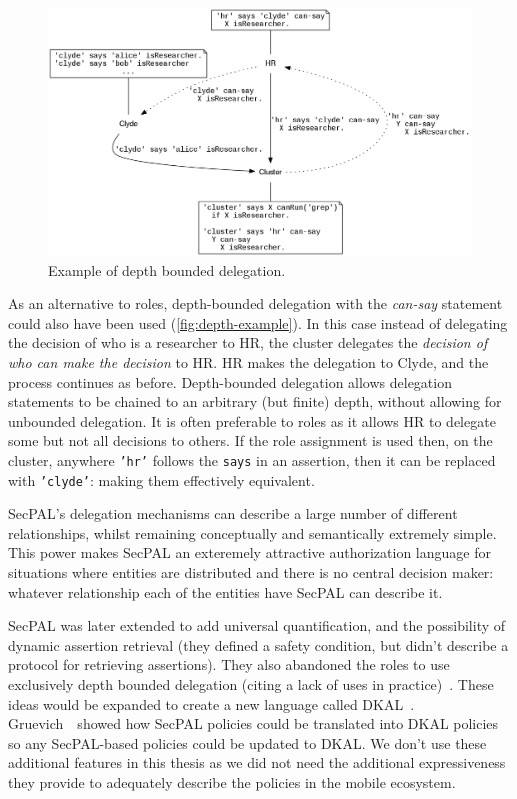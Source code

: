 \documentclass[thesis.tex]{subfiles}
\begin{document}
\begin{figure}
  \centering
  \includegraphics[width=\textwidth]{figures/secpal-example-delegation2.png}
  \caption{Example of depth bounded delegation.}
  \label{fig:depth-example}
\end{figure}

As an alternative to roles, depth-bounded delegation with the
\emph{can-say} statement could also have been used
(\autoref{fig:depth-example}).  In this case instead of delegating the
decision of who is a researcher to HR, the cluster delegates the
\emph{decision of who can make the decision} to HR.  HR makes the
delegation to Clyde, and the process continues as before.
Depth-bounded delegation allows delegation statements to be chained to
an arbitrary (but finite) depth, without allowing for unbounded
delegation.  It is often preferable to roles as it allows HR to
delegate some but not all decisions to others.  If the role assignment
is used then, on the cluster, anywhere \texttt{'hr'} follows the
\texttt{says} in an assertion, then it can be replaced with
\texttt{'clyde'}: making them effectively equivalent.

SecPAL's delegation mechanisms can describe a large number of
different relationships, whilst remaining conceptually and
semantically extremely simple.  This power makes SecPAL an exteremely
attractive authorization language for situations where entities are
distributed and there is no central decision maker: whatever
relationship each of the entities have SecPAL can describe it.

SecPAL was later extended to add universal quantification, and the
possibility of dynamic assertion retrieval (they defined a safety
condition, but didn't describe a protocol for retrieving assertions).
They also abandoned the roles to use exclusively depth bounded
delegation (citing a lack of uses in
practice)~\cite{moritz_y_becker_secpal:_2009}.  These ideas would be
expanded to create a new language called
DKAL~\cite{gurevich_dkal:_2008}.  Gruevich~\etal~showed how SecPAL
policies could be translated into DKAL
policies~\cite{gurevich_dkal:_2008} so any SecPAL-based policies could
be updated to DKAL.  We don't use these additional features in this
thesis as we did not need the additional expressiveness they provide
to adequately describe the policies in the mobile ecosystem.
\end{document}
